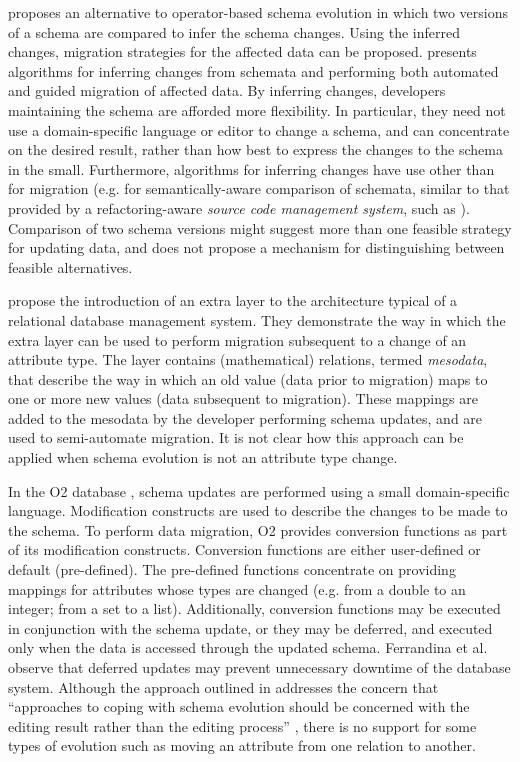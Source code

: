 \cite{lerner00model} proposes an alternative to operator-based schema evolution in which two versions of a schema are compared to infer the schema changes. Using the inferred changes, migration strategies for the affected data can be proposed. \cite{lerner00model} presents algorithms for inferring changes from schemata and performing both automated and guided migration of affected data. By inferring changes, developers maintaining the schema are afforded more flexibility. In particular, they need not use a domain-specific language or editor to change a schema, and can concentrate on the desired result, rather than how best to express the changes to the schema in the small. Furthermore, algorithms for inferring changes have use other than for migration (e.g. for semantically-aware comparison of schemata, similar to that provided by a refactoring-aware \textit{source code management system}, such as \cite{dig07cms}). Comparison of two schema versions might suggest more than one feasible strategy for updating data, and \cite{lerner00model} does not propose a mechanism for distinguishing between feasible alternatives.

\cite{vries04facilitating} propose the introduction of an extra layer to the architecture typical of a relational database management system. They demonstrate the way in which the extra layer can be used to perform migration subsequent to a change of an attribute type. The layer contains (mathematical) relations, termed \textit{mesodata}, that describe the way in which an old value (data prior to migration) maps to one or more new values (data subsequent to migration). These mappings are added to the mesodata by the developer performing schema updates, and are used to semi-automate migration. It is not clear how this approach can be applied when schema evolution is not an attribute type change.

In the O2 database \cite{ferrandina95schema}, schema updates are performed using a small domain-specific language. Modification constructs are used to describe the changes to be made to the schema. To perform data migration, O2 provides conversion functions as part of its modification constructs. Conversion functions are either user-defined or default (pre-defined). The pre-defined functions concentrate on providing mappings for attributes whose types are changed (e.g. from a double to an integer; from a set to a list). Additionally, conversion functions may be executed in conjunction with the schema update, or they may be deferred, and executed only when the data is accessed through the updated schema. Ferrandina et al. observe that deferred updates may prevent unnecessary downtime of the database system. Although the approach outlined in \cite{ferrandina95schema} addresses the concern that ``approaches to coping with schema evolution should be concerned with the editing result rather than the editing process'' \cite{lerner00model}, there is no support for some types of evolution such as moving an attribute from one relation to another.


